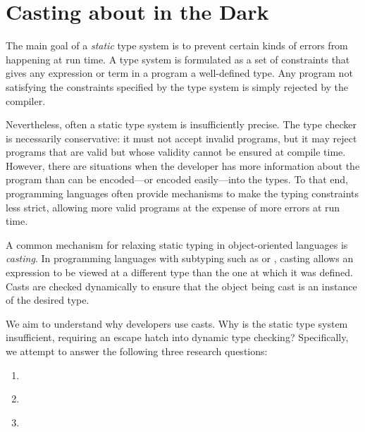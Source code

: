 
\chapter{Casting about in the Dark}
\label{cha:casts}

The main goal of a \emph{static} type system
is to prevent certain kinds of errors from happening at run time.
A type system is formulated as a set of constraints that gives any expression or term in a program a well-defined type.
Any program not satisfying the constraints specified by the type system is
simply rejected by the compiler.

Nevertheless, often a static type system is insufficiently precise.
The type checker is necessarily conservative:
it must not accept invalid programs,
but it may reject programs that are valid but whose validity cannot be ensured at compile time.
However, there are situations when the developer has more information
about the program than can be encoded---or encoded easily---into the types.
To that end, programming languages often provide mechanisms to make the typing constraints less strict,
allowing more valid programs at the expense of more errors at run time.

A common mechanism for relaxing static typing in object-oriented languages is \emph{casting}.
In programming languages with subtyping such as \java{} or \cpp{}, casting
allows
an expression to be viewed at a different type than the one at which it was defined.
Casts are checked dynamically to ensure that the object
being cast is an instance of the desired type.

We aim to understand why developers use casts.
Why is the static type system insufficient,
requiring an escape hatch into dynamic type checking?
Specifically, we attempt to answer the following three research questions:

\begin{enumerate}[label=$RQ/C\arabic*:$,ref=$RQ/C\arabic*$,leftmargin=3.4\parindent]
\item\label{casts:rq1}{\bf \crqA} \crqAdesc
\item\label{casts:rq2}{\bf \crqB} \crqBdesc
\item\label{casts:rq3}{\bf \crqC} \crqCdesc
\end{enumerate}

